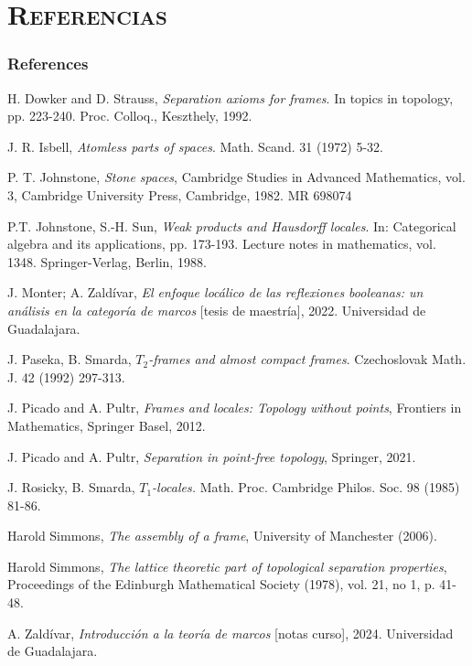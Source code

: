 \documentclass[compress,12pt]{beamer}
\begin{document}
\section*{\textsc{Referencias}}
\begin{frame}[allowframebreaks]
\frametitle{References}
\begin{thebibliography}{20}
 H. Dowker and D. Strauss, \textit{Separation axioms for frames}. In topics in topology, pp. 223-240. Proc. Colloq., Keszthely, 1992.

 J. R. Isbell, \textit{Atomless parts of spaces}. Math. Scand. 31 (1972) 5-32. 

 P. T. Johnstone, \textit{Stone spaces}, Cambridge Studies in Advanced Mathematics, vol. 3, Cambridge University Press, Cambridge, 1982. MR 698074

 P.T. Johnstone, S.-H. Sun, \textit{Weak products and Hausdorff locales}. In: Categorical algebra and its applications, pp. 173-193. Lecture notes in mathematics, vol. 1348. Springer-Verlag, Berlin, 1988.

 J. Monter; A. Zaldívar, \textit{El enfoque locálico de las reflexiones booleanas: un análisis en la categoría de marcos} [tesis de maestría], 2022. Universidad de Guadalajara.

 J. Paseka, B. Smarda, \textit{$T_2$-frames and almost compact frames}. Czechoslovak Math. J. 42 (1992) 297-313.

 J. Picado and A. Pultr, \textit{Frames and locales: Topology without points}, Frontiers in Mathematics, Springer Basel, 2012.

 J. Picado and A. Pultr, \textit{Separation in point-free topology}, Springer, 2021.

 J. Rosicky, B. Smarda, \textit{$T_1$-locales.} Math. Proc. Cambridge Philos. Soc. 98 (1985) 81-86.



 Harold Simmons, \textit{The assembly of a frame}, University of Manchester (2006).

 Harold Simmons, \textit{The lattice theoretic part of topological separation properties}, Proceedings of the Edinburgh Mathematical Society (1978), vol. 21, no 1, p. 41-48.

 A. Zaldívar, \textit{Introducción a la teoría de marcos} [notas curso], 2024. Universidad de Guadalajara.

\end{thebibliography}
\end{frame}
\end{document}
